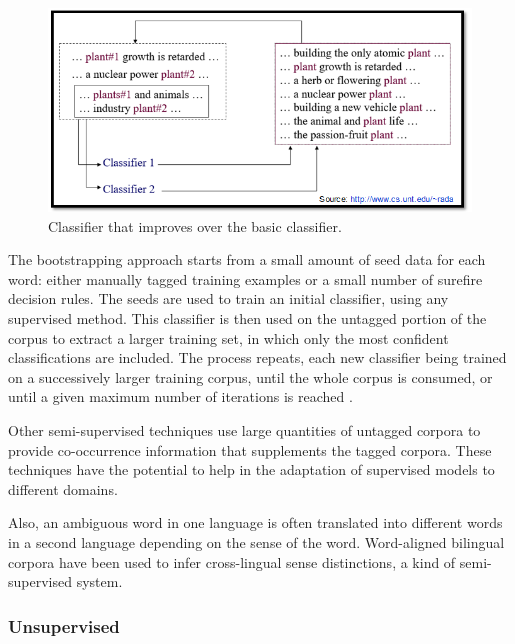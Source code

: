 \begin{figure}[tbh]
	\begin{center}
		\includegraphics[width=\columnwidth]{Union_Background_Chart_semi}
	\end{center}
	\caption{Classifier that improves over the basic classifier. \label{fig3}}
\end{figure}

The bootstrapping approach starts from a small amount of seed data for each word: either manually tagged training examples or a small number of surefire decision rules. 
The seeds are used to train an initial classifier, using any supervised method. 
This classifier is then used on the untagged portion of the corpus to extract a larger training set, in which only the most confident classifications are included. 
The process repeats, each new classifier being trained on a successively larger training corpus, until the whole corpus is consumed, or until a given maximum number of iterations is reached \cite{Blascheck2016}.

Other semi-supervised techniques use large quantities of untagged corpora to provide co-occurrence information that supplements the tagged corpora. 
These techniques have the potential to help in the adaptation of supervised models to different domains.

Also, an ambiguous word in one language is often translated into different words in a second language depending on the sense of the word. 
Word-aligned bilingual corpora have been used to infer cross-lingual sense distinctions, a kind of semi-supervised system\cite{Cheslow2014}.

\subsubsection*{Unsupervised}

